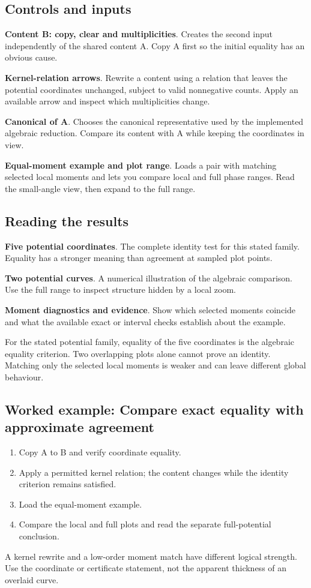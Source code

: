 \documentclass[11pt,a4paper]{article}
\begin{document}
\subsection*{Controls and inputs}
\textbf{Content B: copy, clear and multiplicities}. Creates the second input independently of the shared content A. Copy A first so the initial equality has an obvious cause.

\textbf{Kernel-relation arrows}. Rewrite a content using a relation that leaves the potential coordinates unchanged, subject to valid nonnegative counts. Apply an available arrow and inspect which multiplicities change.

\textbf{Canonical of A}. Chooses the canonical representative used by the implemented algebraic reduction. Compare its content with A while keeping the coordinates in view.

\textbf{Equal-moment example and plot range}. Loads a pair with matching selected local moments and lets you compare local and full phase ranges. Read the small-angle view, then expand to the full range.

\subsection*{Reading the results}
\textbf{Five potential coordinates}. The complete identity test for this stated family. Equality has a stronger meaning than agreement at sampled plot points.

\textbf{Two potential curves}. A numerical illustration of the algebraic comparison. Use the full range to inspect structure hidden by a local zoom.

\textbf{Moment diagnostics and evidence}. Show which selected moments coincide and what the available exact or interval checks establish about the example.

For the stated potential family, equality of the five coordinates is the algebraic equality criterion. Two overlapping plots alone cannot prove an identity. Matching only the selected local moments is weaker and can leave different global behaviour.
\subsection*{Worked example: Compare exact equality with approximate agreement}
\begin{enumerate}
\item Copy A to B and verify coordinate equality.
\item Apply a permitted kernel relation; the content changes while the identity criterion remains satisfied.
\item Load the equal-moment example.
\item Compare the local and full plots and read the separate full-potential conclusion.
\end{enumerate}
A kernel rewrite and a low-order moment match have different logical strength. Use the coordinate or certificate statement, not the apparent thickness of an overlaid curve.
\end{document}
